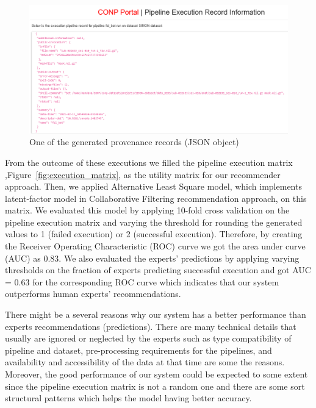 \begin{figure}
    \centering
    \includegraphics[width=\textwidth,height=\textheight,keepaspectratio]{figures/execRecord.png}
    \caption{One of the generated provenance records (JSON object)}
    \label{fig:execRecord}
\end{figure}

From the outcome of these executions we filled the pipeline execution matrix ,Figure~\ref{fig:execution_matrix}, as the utility matrix for our recommender approach. Then, we applied Alternative Least Square model, which implements latent-factor model in Collaborative Filtering recommendation approach, on this matrix. We evaluated this model by applying 10-fold cross validation on the
pipeline execution matrix and varying the threshold for rounding the generated values to 1 (failed execution) or 2 (successful execution). Therefore, by creating the Receiver Operating Characteristic
(ROC) curve we got the area under curve (AUC) as $0.83$. We also evaluated the experts' predictions by applying varying thresholds on the fraction of experts predicting successful execution and got AUC = $0.63$ for the corresponding ROC curve which indicates that our system outperforms human experts' recommendations. 

There might be a several reasons why our system has a better performance than experts recommendations (predictions). There are many technical details that usually are ignored or neglected by the experts such as type compatibility of pipeline and dataset, pre-processing requirements for the pipelines, and availability and accessibility of the data at that time are some the reasons. Moreover, the good performance of our system could be expected to some extent since the pipeline execution matrix is not a random one and there are some sort structural patterns which helps the model having better accuracy.

